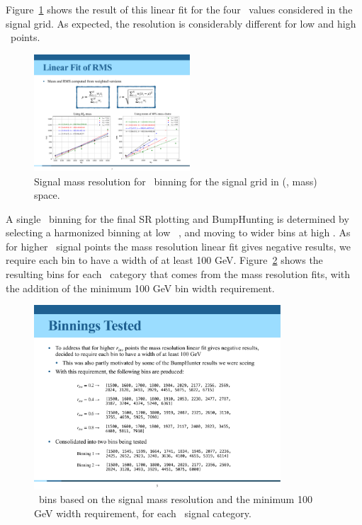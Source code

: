 Figure~\ref{fig:linearfit_binning} shows the result of this linear fit for the four \rinv~values considered in the signal grid.
As expected, the resolution is considerably different for low and high \rinv~points.
\begin{figure}[!htbp]
\centering
   \includegraphics[width=0.52\textwidth]{figures/stats/linearfit_binning}
    \caption{Signal mass resolution for \mt~binning for the signal grid in (\rinv, mass) space.
    \label{fig:linearfit_binning}}
\end{figure}

A single \mt~binning for the final SR plotting and BumpHunting is determined by selecting a harmonized binning at low \mt~, and moving to wider bins at high \mt.
As for higher \rinv~signal points the mass resolution linear fit gives negative results, we require each bin to have a width of at least 100 GeV.
Figure~\ref{fig:bins_rinv} shows the resulting bins for each \rinv~category that comes from the mass resolution fits, with the addition of the minimum 100 GeV bin width requirement.
\begin{figure}[!htbp]
\centering
   \includegraphics[width=0.82\textwidth]{figures/stats/bins_rinv}
    \caption{\mt~bins based on the signal mass resolution and the minimum 100 GeV width requirement, for each \rinv~signal category.
    \label{fig:bins_rinv}}
\end{figure}

